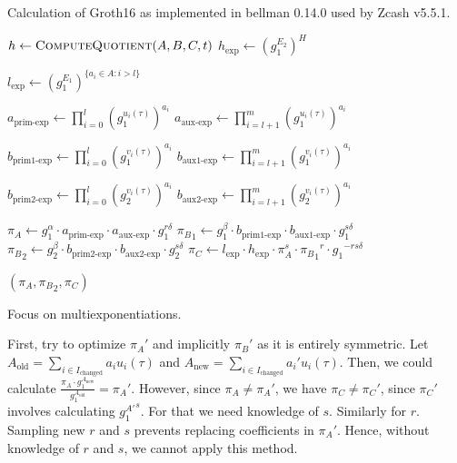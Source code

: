 \documentclass{article}
\begin{document}
\begin{algorithm}
\caption{Calculation of Groth16 as implemented in bellman 0.14.0 used by Zcash v5.5.1.}
\begin{algorithmic}
                \State $h \gets \Call{ComputeQuotient}{A, B, C, t}$
                \State $h_\text{exp} \gets {(g_1^{E_2})}^H$

                \State $l_\text{exp} \gets {(g_1^{E_1})}^{\{a_i \in A \colon i > l\}}$

                \State $a_\text{prim-exp} \gets \prod_{i=0}^l {(g_1^{u_i(\tau)})}^{a_i}$
                \State $a_\text{aux-exp} \gets \prod_{i=l+1}^m {(g_1^{u_i(\tau)})}^{a_i}$

                \State $b_\text{prim1-exp} \gets \prod_{i=0}^l {(g_1^{v_i(\tau)})}^{a_i}$
                \State $b_\text{aux1-exp} \gets \prod_{i=l+1}^m {(g_1^{v_i(\tau)})}^{a_i}$

                \State $b_\text{prim2-exp} \gets \prod_{i=0}^l {(g_2^{v_i(\tau)})}^{a_i}$
                \State $b_\text{aux2-exp} \gets \prod_{i=l+1}^m {(g_2^{v_i(\tau)})}^{a_i}$

                \State $\pi_A \gets g_1^\alpha \cdot a_\text{prim-exp} \cdot a_\text{aux-exp} \cdot g_1^{r\delta}$
                \State ${\pi_B}_1 \gets g_1^\beta \cdot b_\text{prim1-exp} \cdot b_\text{aux1-exp} \cdot g_1^{s\delta}$
                \State ${\pi_B}_2 \gets g_2^\beta \cdot b_\text{prim2-exp} \cdot b_\text{aux2-exp} \cdot g_2^{s\delta}$
                \State $\pi_C \gets l_\text{exp} \cdot h_\text{exp} \cdot \pi_A^s \cdot {{\pi_B}_1}^r \cdot {g_1}^{-rs\delta}$

                \State \Return $(\pi_A, {\pi_B}_2, \pi_C)$
        \EndProcedure
\end{algorithmic}
\end{algorithm}

Focus on multiexponentiations.

First, try to optimize $\pi_A'$ and implicitly $\pi_B'$ as it is entirely symmetric.
Let $A_\text{old} = \sum_{i\in I_\text{changed}} a_i u_i(\tau)$ and $A_\text{new} = \sum_{i\in I_\text{changed}} a_i' u_i(\tau)$.
Then, we could calculate $\frac{\pi_A\cdot g_1^{A_\text{new}}}{g_1^{A_\text{old}}} = \pi_A'$.
However, since $\pi_A \neq \pi_A'$, we have $\pi_C \neq \pi_C'$, since $\pi_C'$ involves calculating ${g_1^{A'}}^s$. For that we need knowledge of $s$.
Similarly for $r$.
Sampling new $r$ and $s$ prevents replacing coefficients in $\pi_A'$.
Hence, without knowledge of $r$ and $s$, we cannot apply this method.
\end{document}

